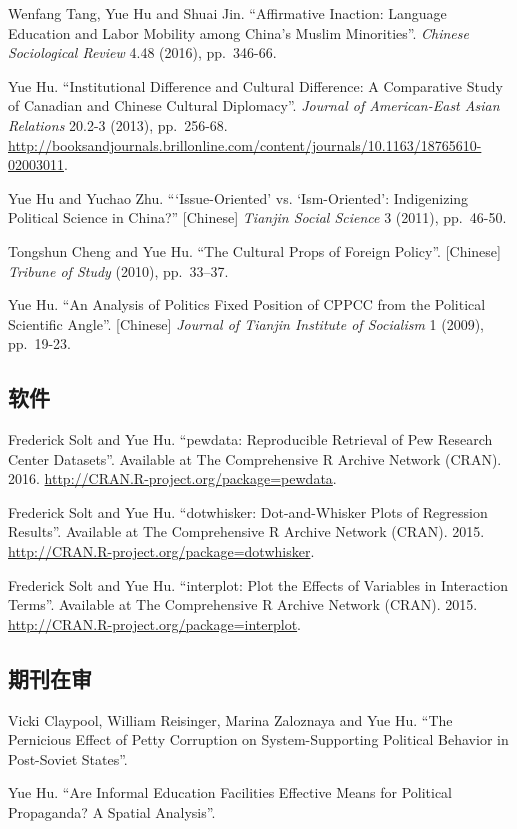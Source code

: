 \documentclass[10.5pt,]{article}
\begin{document}
Wenfang Tang, Yue Hu and Shuai Jin. ``Affirmative Inaction: Language
Education and Labor Mobility among China's Muslim Minorities''.
\emph{Chinese Sociological Review} 4.48 (2016), pp.~346-66.

Yue Hu. ``Institutional Difference and Cultural Difference: A
Comparative Study of Canadian and Chinese Cultural Diplomacy''.
\emph{Journal of American-East Asian Relations} 20.2-3 (2013),
pp.~256-68.
\url{http://booksandjournals.brillonline.com/content/journals/10.1163/18765610-02003011}.

Yue Hu and Yuchao Zhu. ```Issue-Oriented' vs. `Ism-Oriented':
Indigenizing Political Science in China?'' {[}Chinese{]}
\emph{Tianjin Social Science} 3 (2011), pp.~46-50.

Tongshun Cheng and Yue Hu. ``The Cultural Props of Foreign Policy''.
{[}Chinese{]} \emph{Tribune of Study} (2010), pp.~33--37.

Yue Hu. ``An Analysis of Politics Fixed Position of CPPCC from the
Political Scientific Angle''. {[}Chinese{]}
\emph{Journal of Tianjin Institute of Socialism} 1 (2009), pp.~19-23.

\subsection{软件}

Frederick Solt and Yue Hu. ``pewdata: Reproducible Retrieval of Pew
Research Center Datasets''. Available at The Comprehensive R Archive
Network (CRAN). 2016. \url{http://CRAN.R-project.org/package=pewdata}.

Frederick Solt and Yue Hu. ``dotwhisker: Dot-and-Whisker Plots of
Regression Results''. Available at The Comprehensive R Archive Network
(CRAN). 2015. \url{http://CRAN.R-project.org/package=dotwhisker}.

Frederick Solt and Yue Hu. ``interplot: Plot the Effects of Variables in
Interaction Terms''. Available at The Comprehensive R Archive Network
(CRAN). 2015. \url{http://CRAN.R-project.org/package=interplot}.

\subsection{期刊在审}

Vicki Claypool, William Reisinger, Marina Zaloznaya and Yue Hu. ``The
Pernicious Effect of Petty Corruption on System-Supporting Political
Behavior in Post-Soviet States''.

Yue Hu. ``Are Informal Education Facilities Effective Means for
Political Propaganda? A Spatial Analysis''.
\end{document}
